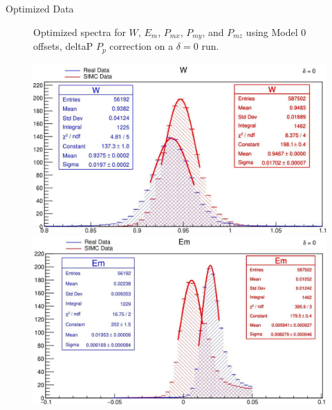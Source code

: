 \documentclass[final]{beamer}
\newlength{\colwidth}
\begin{document}
\begin{frame}[t]
\begin{columns}[t]
\begin{column}{\colwidth}
\begin{block}{Optimized Data}
\begin{figure}
\begin{minipage}[t]{0.3\textwidth}
  \end{minipage}
\vspace{-.75cm}
  \caption{Optimized spectra for $W$, $E_m$, $P_{mx}$, $P_{my}$, and $P_{mz}$ using Model 0 offsets, deltaP $P_p$ correction on a $\delta=0$ run.}
\end{figure}

\vspace{-1.25cm}
\begin{figure}
\begin{minipage}[t]{0.49\textwidth}
    \includegraphics[width=\linewidth]{calibrated data/model 3/W_0.jpg}
  \end{minipage}
  \hfill
  \begin{minipage}[t]{0.5\textwidth}
    \includegraphics[width=\linewidth]{calibrated data/model 3/Em_0.jpg}
  \end{minipage}

  \vspace{0cm}  %


\end{figure}
\end{block}
\end{column}
\end{columns}
\end{frame}
\end{document}
